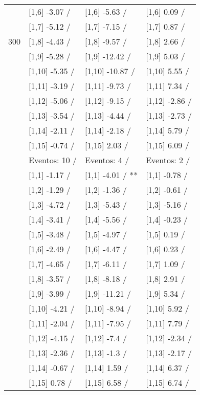 \begin{table}
\begin{tabular}[t]{llll}
 & {}[1,6] -3.07  / & {}[1,6] -5.63  / & {}[1,6] 0.09  /\\
 & {}[1,7] -5.12  / & {}[1,7] -7.15  / & {}[1,7] 0.87  /\\
300 & {}[1,8] -4.43  / & {}[1,8] -9.57  / & {}[1,8] 2.66  /\\
\addlinespace
 & {}[1,9] -5.28  / & {}[1,9] -12.42  / & {}[1,9] 5.03  /\\
 & {}[1,10] -5.35  / & {}[1,10] -10.87  / & {}[1,10] 5.55  /\\
 & {}[1,11] -3.19  / & {}[1,11] -9.73  / & {}[1,11] 7.34  /\\
 & {}[1,12] -5.06  / & {}[1,12] -9.15  / & {}[1,12] -2.86  /\\
 & {}[1,13] -3.54  / & {}[1,13] -4.44  / & {}[1,13] -2.73  /\\
\addlinespace
 & {}[1,14] -2.11  / & {}[1,14] -2.18  / & {}[1,14] 5.79  /\\
 & {}[1,15] -0.74  / & {}[1,15] 2.03  / & {}[1,15] 6.09  /\\
 & Eventos:  10 / & Eventos:  4 / & Eventos:  2 /\\
 & {}[1,1] -1.17  / & {}[1,1] -4.01  / ** & {}[1,1] -0.78  /\\
 & {}[1,2] -1.29  / & {}[1,2] -1.36  / & {}[1,2] -0.61  /\\
\addlinespace
 & {}[1,3] -4.72  / & {}[1,3] -5.43  / & {}[1,3] -5.16  /\\
 & {}[1,4] -3.41  / & {}[1,4] -5.56  / & {}[1,4] -0.23  /\\
 & {}[1,5] -3.48  / & {}[1,5] -4.97  / & {}[1,5] 0.19  /\\
 & {}[1,6] -2.49  / & {}[1,6] -4.47  / & {}[1,6] 0.23  /\\
 & {}[1,7] -4.65  / & {}[1,7] -6.11  / & {}[1,7] 1.09  /\\
\addlinespace
500 & {}[1,8] -3.57  / & {}[1,8] -8.18  / & {}[1,8] 2.91  /\\
 & {}[1,9] -3.99  / & {}[1,9] -11.21  / & {}[1,9] 5.34  /\\
 & {}[1,10] -4.21  / & {}[1,10] -8.94  / & {}[1,10] 5.92  /\\
 & {}[1,11] -2.04  / & {}[1,11] -7.95  / & {}[1,11] 7.79  /\\
 & {}[1,12] -4.15  / & {}[1,12] -7.4  / & {}[1,12] -2.34  /\\
\addlinespace
 & {}[1,13] -2.36  / & {}[1,13] -1.3  / & {}[1,13] -2.17  /\\
 & {}[1,14] -0.67  / & {}[1,14] 1.59  / & {}[1,14] 6.37  /\\
 & {}[1,15] 0.78  / & {}[1,15] 6.58  / & {}[1,15] 6.74  /\\
\bottomrule
\end{tabular}
\end{table}
